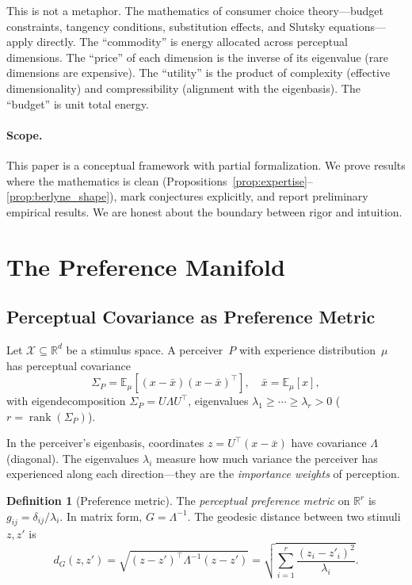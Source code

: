 \documentclass[journal]{IEEEtran}
\theoremstyle{definition}
\newtheorem{definition}[theorem]{Definition}
\theoremstyle{remark}
\newcommand{\R}{\mathbb{R}}
\newcommand{\E}{\mathbb{E}}
\DeclareMathOperator{\rank}{rank}
\begin{document}
This is not a metaphor.  The mathematics of consumer choice
theory---budget constraints, tangency conditions, substitution
effects, and Slutsky equations---apply directly.  The
``commodity'' is energy allocated across perceptual dimensions.
The ``price'' of each dimension is the inverse of its eigenvalue
(rare dimensions are expensive).  The ``utility'' is the product
of complexity (effective dimensionality) and compressibility
(alignment with the eigenbasis).  The ``budget'' is unit total
energy.

\paragraph{Scope.}
This paper is a conceptual framework with partial formalization.
We prove results where the mathematics is clean
(Propositions~\ref{prop:expertise}--\ref{prop:berlyne_shape}),
mark conjectures explicitly, and report preliminary empirical
results.  We are honest about the boundary between rigor and
intuition.


\section{The Preference Manifold}
\label{sec:manifold}

\subsection{Perceptual Covariance as Preference Metric}

Let $\mathcal{X} \subseteq \R^d$ be a stimulus space.  A
perceiver~$P$ with experience distribution~$\mu$ has perceptual
covariance
\begin{equation}
    \Sigma_P = \E_\mu[(x-\bar{x})(x-\bar{x})^\top],
    \quad \bar{x} = \E_\mu[x],
\end{equation}
with eigendecomposition $\Sigma_P = U\Lambda U^\top$, eigenvalues
$\lambda_1 \geq \cdots \geq \lambda_r > 0$ ($r = \rank(\Sigma_P)$).

In the perceiver's eigenbasis, coordinates $z = U^\top(x-\bar{x})$
have covariance $\Lambda$ (diagonal).  The eigenvalues $\lambda_i$
measure how much variance the perceiver has experienced along each
direction---they are the \emph{importance weights} of perception.

\begin{definition}[Preference metric]
\label{def:metric}
The \emph{perceptual preference metric} on $\R^r$ is
$g_{ij} = \delta_{ij} / \lambda_i$.  In matrix form,
$G = \Lambda^{-1}$.  The geodesic distance between two stimuli
$z, z'$ is
\begin{equation}
    d_G(z, z') = \sqrt{(z-z')^\top \Lambda^{-1} (z-z')}
    = \sqrt{\sum_{i=1}^r \frac{(z_i - z'_i)^2}{\lambda_i}}.
\end{equation}
\end{definition}
\end{document}
